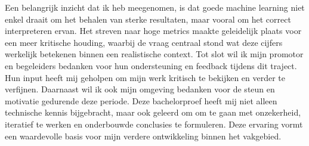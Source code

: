 \newline
\newline
Een belangrijk inzicht dat ik heb meegenomen, is dat goede machine learning niet enkel draait om het behalen van sterke resultaten, maar vooral om het correct interpreteren ervan. Het streven naar hoge metrics maakte geleidelijk plaats voor een meer kritische houding, waarbij de vraag centraal stond wat deze cijfers werkelijk betekenen binnen een realistische context.
\newline
\newline
Tot slot wil ik mijn promotor en begeleiders bedanken voor hun ondersteuning en feedback tijdens dit traject. Hun input heeft mij geholpen om mijn werk kritisch te bekijken en verder te verfijnen. Daarnaast wil ik ook mijn omgeving bedanken voor de steun en motivatie gedurende deze periode.
\newline
\newline
Deze bachelorproef heeft mij niet alleen technische kennis bijgebracht, maar ook geleerd om om te gaan met onzekerheid, iteratief te werken en onderbouwde conclusies te formuleren. Deze ervaring vormt een waardevolle basis voor mijn verdere ontwikkeling binnen het vakgebied.